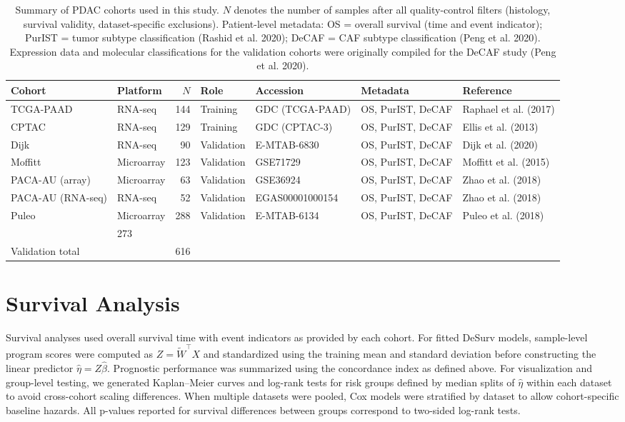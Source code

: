 \documentclass[
]{article}
\begin{document}
\begin{table}[ht]
\centering
\caption{Summary of PDAC cohorts used in this study. $N$ denotes the number of
samples after all quality-control filters (histology, survival validity,
dataset-specific exclusions). Patient-level metadata: OS = overall survival
(time and event indicator); PurIST = tumor subtype classification
(Rashid et al. 2020); DeCAF = CAF subtype classification
(Peng et al. 2020). Expression data and molecular classifications
for the validation cohorts were originally compiled for the DeCAF study
(Peng et al. 2020).}
\label{tab:cohorts}
\footnotesize
\begin{tabular}{llrllll}
\toprule
Cohort & Platform & $N$ & Role & Accession & Metadata & Reference \\
\midrule
TCGA-PAAD        & RNA-seq    & 144 & Training   & GDC (TCGA-PAAD) & OS, PurIST, DeCAF & Raphael et al. (2017) \\
CPTAC            & RNA-seq    & 129 & Training   & GDC (CPTAC-3)    & OS, PurIST, DeCAF & Ellis et al. (2013) \\
\addlinespace
Dijk             & RNA-seq    &  90 & Validation & E-MTAB-6830      & OS, PurIST, DeCAF & Dijk et al. (2020) \\
Moffitt          & Microarray & 123 & Validation & GSE71729         & OS, PurIST, DeCAF & Moffitt et al. (2015) \\
PACA-AU (array)  & Microarray &  63 & Validation & GSE36924         & OS, PurIST, DeCAF & Zhao et al. (2018) \\
PACA-AU (RNA-seq) & RNA-seq   &  52 & Validation & EGAS00001000154  & OS, PurIST, DeCAF & Zhao et al. (2018) \\
Puleo            & Microarray & 288 & Validation & E-MTAB-6134      & OS, PurIST, DeCAF & Puleo et al. (2018) \\
\addlinespace
\multicolumn{2}{l}{Training total} & 273 & & & & \\
\multicolumn{2}{l}{Validation total} & 616 & & & & \\
\bottomrule
\end{tabular}
\end{table}

\section{Survival Analysis}

Survival analyses used overall survival time with event indicators as
provided by each cohort. For fitted DeSurv models, sample-level program
scores were computed as \(Z = \widetilde{W}^\top X\) and standardized
using the training mean and standard deviation before constructing the
linear predictor \(\hat{\eta} = Z \hat{\beta}\). Prognostic performance
was summarized using the concordance index as defined above. For
visualization and group-level testing, we generated Kaplan--Meier curves
and log-rank tests for risk groups defined by median splits of
\(\hat{\eta}\) within each dataset to avoid cross-cohort scaling
differences. When multiple datasets were pooled, Cox models were
stratified by dataset to allow cohort-specific baseline hazards. All
p-values reported for survival differences between groups correspond to
two-sided log-rank tests.
\end{document}
